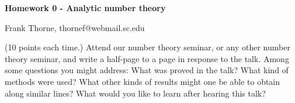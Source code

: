 \documentclass[12pt]{article}
\begin{document}
\setlength{\topmargin}{-2mm}





\author{Seminar participation.}
\begin{center}{\bf Homework 0 - Analytic number theory}
\end{center}
\begin{center}Frank Thorne, thornef@webmail.sc.edu
\end{center}

(10 points each time.) Attend our number theory seminar, or any other number theory seminar,
and write a half-page to a page in response to the talk. Among some questions you might address:
What was proved in the talk? What kind of methods were used? What other kinds of results might 
one be able to obtain along similar lines? What would you like to learn after hearing this talk?
\end{document}
